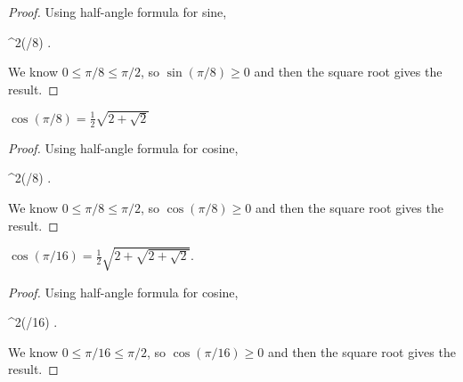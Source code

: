 \begin{proof}
Using half-angle formula for sine,
\begin{calculation}
  \sin^{2}(\pi/8)
  .
\end{calculation}
We know $0\leq\pi/8\leq\pi/2$, so $\sin(\pi/8)\geq 0$ and then the
square root gives the result.
\end{proof}

\begin{proposition}\label{prop:cosine-of-pi-over-eight}
$\displaystyle{\cos(\pi/8) = \frac{1}{2}\sqrt{2 + \sqrt{2}}}$
\end{proposition}

\begin{proof}
Using half-angle formula for cosine,
\begin{calculation}
  \cos^{2}(\pi/8)
  .
\end{calculation}
We know $0\leq\pi/8\leq\pi/2$, so $\cos(\pi/8)\geq 0$ and then the
square root gives the result.
\end{proof}

\begin{proposition}
$\displaystyle{\cos(\pi/16) = \frac{1}{2}\sqrt{2 + \sqrt{2 + \sqrt{2}}}}$.
\end{proposition}

\begin{proof}
Using half-angle formula for cosine,
\begin{calculation}
  \cos^{2}(\pi/16)
  .
\end{calculation}
We know $0\leq\pi/16\leq\pi/2$, so $\cos(\pi/16)\geq 0$ and then the
square root gives the result.
\end{proof}

